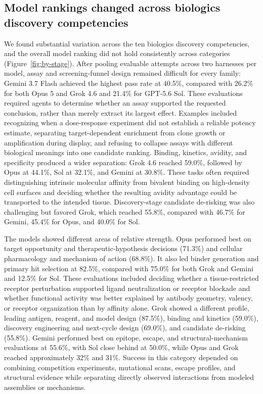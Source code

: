 \documentclass[10pt,letterpaper]{article}
\begin{document}
\ResumeBody
\subsection{Model rankings changed across biologics discovery competencies}
We found substantial variation across the ten biologics discovery competencies, and the overall model ranking did not hold consistently across categories (Figure~\ref{fig:by-stage}). After pooling evaluable attempts across two harnesses per model, assay and screening-funnel design remained difficult for every family: Gemini 3.7 Flash achieved the highest pass rate at 40.5\%, compared with 26.2\% for both Opus 5 and Grok 4.6 and 21.4\% for GPT-5.6 Sol. These evaluations required agents to determine whether an assay supported the requested conclusion, rather than merely extract its largest effect. Examples included recognizing when a dose-response experiment did not establish a reliable potency estimate, separating target-dependent enrichment from clone growth or amplification during display, and refusing to collapse assays with different biological meanings into one candidate ranking. Binding, kinetics, avidity, and specificity produced a wider separation: Grok 4.6 reached 59.0\%, followed by Opus at 44.1\%, Sol at 32.1\%, and Gemini at 30.8\%. These tasks often required distinguishing intrinsic molecular affinity from bivalent binding on high-density cell surfaces and deciding whether the resulting avidity advantage could be transported to the intended tissue. Discovery-stage candidate de-risking was also challenging but favored Grok, which reached 55.8\%, compared with 46.7\% for Gemini, 45.4\% for Opus, and 40.0\% for Sol.
\par
The models showed different areas of relative strength. Opus performed best on target opportunity and therapeutic-hypothesis decisions (71.3\%) and cellular pharmacology and mechanism of action (68.8\%). It also led binder generation and primary hit selection at 82.5\%, compared with 75.0\% for both Grok and Gemini and 12.5\% for Sol. These evaluations included deciding whether a tissue-restricted receptor perturbation supported ligand neutralization or receptor blockade and whether functional activity was better explained by antibody geometry, valency, or receptor organization than by affinity alone. Grok showed a different profile, leading antigen, reagent, and model design (87.5\%), binding and kinetics (59.0\%), discovery engineering and next-cycle design (69.0\%), and candidate de-risking (55.8\%). Gemini performed best on epitope, escape, and structural-mechanism evaluations at 55.6\%, with Sol close behind at 50.0\%, while Opus and Grok reached approximately 32\% and 31\%. Success in this category depended on combining competition experiments, mutational scans, escape profiles, and structural evidence while separating directly observed interactions from modeled assemblies or mechanisms.
\end{document}
